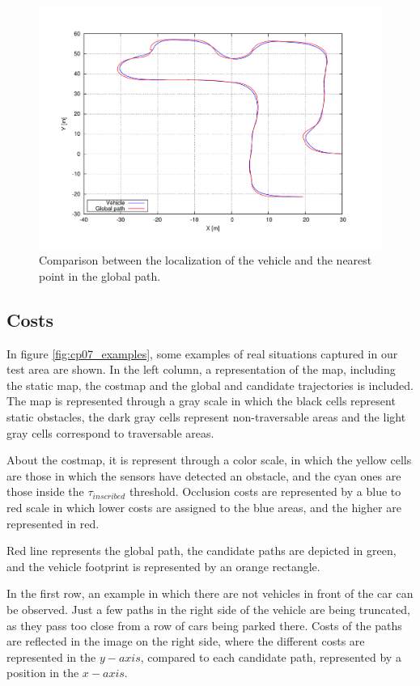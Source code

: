 \begin{figure}[h!]
  \centering
  \includegraphics[width=\textwidth,height=0.5\textwidth,trim=50 50 90 60, clip]{differences}
  \caption{Comparison between the localization of the vehicle and the nearest point in the global path.}\label{fig:cp07_localization_diff}
\end{figure}

\subsection{Costs}\label{ch:chapter07_02_02}

In figure \ref{fig:cp07_examples}, some examples of real situations captured in our test area are shown. In the left column, a representation of the map, including the static map, the costmap and the global and candidate trajectories is included. The map is represented through a gray scale in which the black cells represent static obstacles, the dark gray cells represent non-traversable areas and the light gray cells correspond to traversable areas.

About the costmap, it is represent through a color scale, in which the yellow cells are those in which the sensors have detected an obstacle, and the cyan ones are those inside the $\tau_{inscribed}$ threshold. Occlusion costs are represented by a blue to red scale in which lower costs are assigned to the blue areas, and the higher are represented in red.

Red line represents the global path, the candidate paths are depicted in green, and the vehicle footprint is represented by an orange rectangle.

In the first row, an example in which there are not vehicles in front of the car can be observed. Just a few paths in the right side of the vehicle are being truncated, as they pass too close from a row of cars being parked there. Costs of the paths are reflected in the image on the right side, where the different costs are represented in the $y-axis$, compared to each candidate path, represented by a position in the $x-axis$. 

